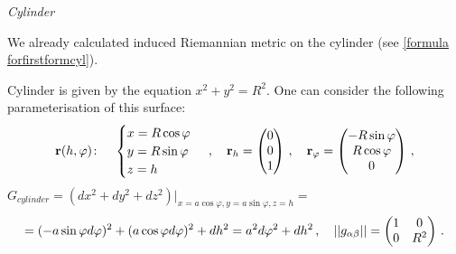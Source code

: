 \documentclass[12pt]{article}
\theoremstyle{theorem}
\numberwithin{equation}{section}
\begin{document}
\m

{\it Cylinder}

\m

  We already calculated induced Riemannian metric on the cylinder (see \eqref {formula forfirstformcyl}).

 Cylinder is given by the equation $x^2+y^2=R^2$. One can consider the following
parameterisation
 of this surface:
\begin{equation}\label{surface11}
  {\bf r}(h,\varphi)\colon\quad
  \begin{cases}
  x=R\cos\varphi\\
  y=R\sin\varphi\\
  z=h\\
  \end{cases}\,,\quad   {\bf r}_h=
  \begin{pmatrix}
        0\\
        0\\
        1\\
   \end{pmatrix}\,,
\quad
  {\bf r}_\varphi=\begin{pmatrix}
        -R\sin\varphi\\
        R\cos\varphi\\
          0\\
   \end{pmatrix}\,,
\end{equation}
$G_{cylinder}=\left(dx^2+dy^2+dz^2\right)\big\vert_{x=a\cos\varphi,y=a\sin\varphi,z=h}=$
        \begin{equation*}\label{firtsquadraticformcylinder(diff)11}
               =(-a\sin\varphi d\varphi)^2+(a\cos\varphi d\varphi)^2+dh^2=a^2d\varphi^2+dh^2\,,\quad
               ||g_{\alpha\beta}||=
  \begin{pmatrix}
   1 & 0 \\
   0& R^2 \\
   \end{pmatrix}\,.
        \end{equation*}
\end{document}

